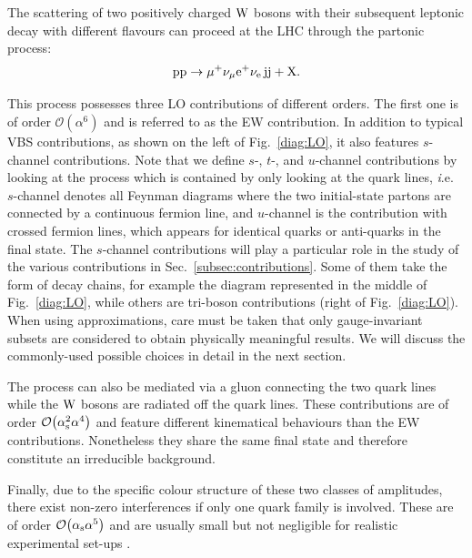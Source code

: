 The scattering of two positively charged $\text{W}$ bosons with their subsequent leptonic decay with different flavours can proceed at the LHC through the partonic process:
%
\begin{equation}
\text{p}\text{p}\to\mu^+\nu_\mu{\rm e}^+\nu_{\rm e}\,\text{j}\text{j}+\mathrm{X}.
\end{equation}

This process possesses three LO contributions of different orders.
The first one is of order $\mathcal{O}{\left(\alpha^{6}\right)}$ and is referred to as the EW contribution.
In addition to typical VBS contributions, as shown on the left of Fig.~\ref{diag:LO}, it also features $s$-channel contributions.
Note that we define $s$-, $t$-, and $u$-channel contributions by looking at the process which is contained by only looking at the quark lines, {\emph i.e.}\ $s$-channel denotes all Feynman diagrams where the two initial-state partons are connected by a continuous fermion line, and $u$-channel is the contribution with crossed fermion lines, which appears for identical quarks or anti-quarks in the final state.
The $s$-channel contributions will play a particular role in the study of the various contributions in Sec.~\ref{subsec:contributions}.
Some of them take the form of decay chains, for example the diagram represented in the middle of Fig.~\ref{diag:LO}, while others are tri-boson contributions (right of Fig.~\ref{diag:LO}).
When using approximations, care must be taken that only gauge-invariant subsets are considered to obtain physically meaningful results. We will discuss the commonly-used possible choices in detail in the next section.

The process can also be mediated via a gluon connecting the two quark lines while the $\text{W}$ bosons are radiated off the quark lines.
These contributions are of order $\mathcal{O}{\left(\alpha_\text{s}^{2}\alpha^{4}\right)}$ and feature different kinematical behaviours than the EW contributions.
Nonetheless they share the same final state and therefore constitute an irreducible background.

Finally, due to the specific colour structure of these two classes of amplitudes, there exist non-zero interferences if only one quark family is involved.
These are of order $\mathcal{O}{\left(\alpha_{\rm s}\alpha^{5}\right)}$ and are usually small but not negligible for realistic experimental set-ups \cite{Biedermann:2017bss}.

